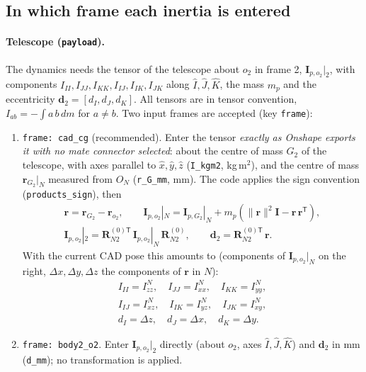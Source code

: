 \documentclass[10pt,a4paper]{article}
\numberwithin{equation}{section}
\begin{document}
\subsection{In which frame each inertia is entered}\label{subsec:input_frames}
\paragraph{Telescope (\texttt{payload}).} The dynamics needs the tensor of the telescope about $o_2$ in frame 2, $\mathbf I_{p,o_2}|_2$, with components $I_{II}, I_{JJ}, I_{KK}, I_{IJ}, I_{IK}, I_{JK}$ along $\hat I, \hat J, \hat K$, the mass $m_p$ and the eccentricity $\mathbf d_2 = [d_I, d_J, d_K]$. All tensors are in tensor convention, $I_{ab} = -\int a\,b\,dm$ for $a\neq b$. Two input frames are accepted (key \texttt{frame}):
\begin{enumerate}
\item \texttt{frame: cad\_cg} (recommended). Enter the tensor \emph{exactly as Onshape exports it with no mate connector selected}: about the centre of mass $G_2$ of the telescope, with axes parallel to $\hat x, \hat y, \hat z$ (\texttt{I\_kgm2}, kg\,m$^2$), and the centre of mass $\mathbf r_{G_2}|_N$ measured from $O_N$ (\texttt{r\_G\_mm}, mm). The code applies the sign convention (\texttt{products\_sign}), then
\begin{gather}
\mathbf r = \mathbf r_{G_2} - \mathbf r_{o_2}, \qquad\mathbf I_{p,o_2}|_N = \mathbf I_{p,G_2}|_N + m_p\left(\|\mathbf r\|^2\mathbf I - \mathbf r\,\mathbf r^{\mathsf T}\right), \\\mathbf I_{p,o_2}|_2 = \mathbf R_{N2}^{(0)\mathsf T}\,\mathbf I_{p,o_2}|_N\,\mathbf R_{N2}^{(0)}, \qquad \mathbf d_2 = \mathbf R_{N2}^{(0)\mathsf T}\,\mathbf r .
\end{gather}
With the current CAD pose this amounts to (components of $\mathbf I_{p,o_2}|_N$ on the right, $\Delta x, \Delta y, \Delta z$ the components of $\mathbf r$ in $N$):
\begin{gather}
I_{II} = I^{N}_{zz},\quad I_{JJ} = I^{N}_{xx},\quad I_{KK} = I^{N}_{yy}, \\
I_{IJ} = I^{N}_{xz},\quad I_{IK} = I^{N}_{yz},\quad I_{JK} = I^{N}_{xy}, \\
d_I = \Delta{z},\quad d_J = \Delta{x},\quad d_K = \Delta{y}.
\end{gather}
\item \texttt{frame: body2\_o2}. Enter $\mathbf I_{p,o_2}|_2$ directly (about $o_2$, axes $\hat I, \hat J, \hat K$) and $\mathbf d_2$ in mm (\texttt{d\_mm}); no transformation is applied.
\end{enumerate}
\end{document}
